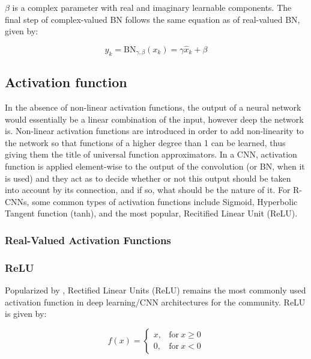$\beta$ is a complex parameter with real and imaginary learnable components. The final step of complex-valued BN follows the same equation as of real-valued BN, given by:

 \begin{equation}
y_{k} = \mathrm{BN}_{\gamma,\beta}(x_{k}) = \gamma\hat{x}_{k} + \beta
\label{eqcbn5}
\end{equation}

 \subsection{Activation function}\label{ssec:act_fn}
 In the absence of non-linear activation functions, the output of a neural network would essentially be a linear combination of the input, however deep the network is. Non-linear activation functions are introduced in order to add non-linearity to the network so that functions of a higher degree than 1 can be learned, thus giving them the title of universal function approximators. In a CNN, activation function is applied element-wise to the output of the convolution (or BN, when it is used) and they act as to decide whether or not this output should be taken into account by its connection, and if so, what should be the nature of it. For $\mathrm{R}$-CNNs, some common types of activation functions include Sigmoid, Hyperbolic Tangent function (tanh), and the most popular, Recitified Linear Unit (ReLU).
 
 
  \subsubsection{Real-Valued Activation Functions}
   \subsubsection{ReLU}
   
Popularized by \cite{krizhevsky2012imagenet}, Rectified Linear Units (ReLU) \cite{nair2010rectified} remains the most commonly used activation function in deep learning/CNN architectures for the community. ReLU is given by:

\begin{equation}
f(x) =  
\begin{cases} 
x , &\textrm{for} \ x\ge 0\\
0 , &\textrm{for} \ x < 0
\end{cases}
\end{equation}
 
